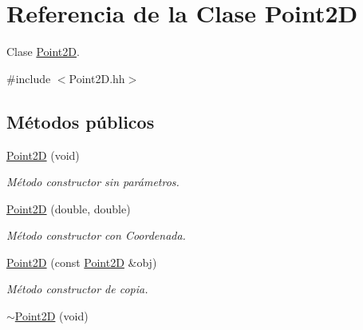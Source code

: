 \hypertarget{class_point2_d}{\section{Referencia de la Clase Point2\-D}
\label{class_point2_d}
}


Clase \hyperlink{class_point2_d}{Point2\-D}.  




{\ttfamily \#include $<$Point2\-D.\-hh$>$}

\subsection*{Métodos públicos}
\begin{DoxyCompactItemize}
\item 
\hyperlink{class_point2_d_a1b119032e0b60ef27f8610d640e241e2}{Point2\-D} (void)
\begin{DoxyCompactList}\small\item\em Método constructor sin parámetros. \end{DoxyCompactList}\item 
\hyperlink{class_point2_d_a0e3ee506aac9ae6461bdf6083c7596b0}{Point2\-D} (double, double)
\begin{DoxyCompactList}\small\item\em Método constructor con Coordenada. \end{DoxyCompactList}\item 
\hyperlink{class_point2_d_aee8bdb479f01aaea16059b9d7a6e3fe4}{Point2\-D} (const \hyperlink{class_point2_d}{Point2\-D} \&obj)
\begin{DoxyCompactList}\small\item\em Método constructor de copia. \end{DoxyCompactList}\item 
\hypertarget{class_point2_d_ada35e16f1d98a3be260ebb4baeba538b}{\hyperlink{class_point2_d_ada35e16f1d98a3be260ebb4baeba538b}{$\sim$\-Point2\-D} (void)}\label{class_point2_d_ada35e16f1d98a3be260ebb4baeba538b}


\end{DoxyCompactItemize}
